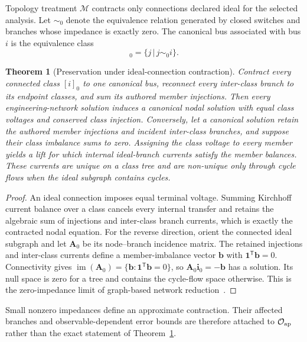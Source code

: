 \documentclass[final,5p,times,twocolumn]{elsarticle}
\newtheorem{theorem}{Theorem}
\begin{document}
Topology treatment $\mathcal M$ contracts only connections declared ideal for
the selected analysis. Let $\sim_0$ denote the equivalence relation generated by
closed switches and branches whose impedance is exactly zero. The canonical bus
associated with bus $i$ is the equivalence class
\begin{equation}
 [i]_0=\{j\,|\,j\sim_0 i\}.
 \label{eq:merge-class}
\end{equation}

\begin{theorem}[Preservation under ideal-connection contraction]
\label{thm:ideal-contraction}
Contract every connected class $[i]_0$ to one canonical bus, reconnect every
inter-class branch to its endpoint classes, and sum its authored member
injections. Then every engineering-network solution induces a canonical nodal
solution with equal class voltages and conserved class injection. Conversely,
let a canonical solution retain the authored member injections and incident
inter-class branches, and suppose their class imbalance sums to zero. Assigning
the class voltage to every member yields a lift for which internal ideal-branch
currents satisfy the member balances. These currents are unique on a class tree
and are non-unique only through cycle flows when the ideal subgraph contains
cycles.
\end{theorem}
\begin{proof}
An ideal connection imposes equal terminal voltage. Summing Kirchhoff current
balance over a class cancels every internal transfer and retains the algebraic
sum of injections and inter-class branch currents, which is exactly the
contracted nodal equation. For the reverse direction, orient the connected
ideal subgraph and let $\bm A_0$ be its node--branch incidence matrix. The
retained injections and inter-class currents define a member-imbalance vector
$\bm b$ with $\bm 1^{\mathsf T}\bm b=0$. Connectivity gives
$\operatorname{im}(\bm A_0)=\{\bm b:\bm 1^{\mathsf T}\bm b=0\}$, so
$\bm A_0\bm i_0=-\bm b$ has a solution. Its null space is zero for a tree and
contains the cycle-flow space otherwise. This is the zero-impedance limit of
graph-based network reduction~\cite{dorfler2013kron}.
\end{proof}

Small nonzero impedances define an approximate contraction. Their affected
branches and observable-dependent error bounds are therefore attached to
$\mathcal O_{\rm ap}$ rather than the exact statement of
Theorem~\ref{thm:ideal-contraction}.
\end{document}
